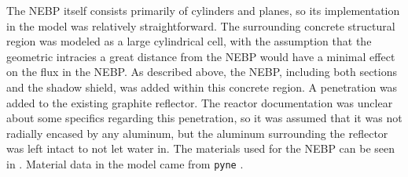 The NEBP itself consists primarily of cylinders and planes, so its implementation in the model was relatively straightforward.
The surrounding concrete structural region was modeled as a large cylindrical cell, with the assumption that the geometric intracies a great distance from the NEBP would have a minimal effect on the flux in the NEBP.
As described above, the NEBP, including both sections and the shadow shield, was added within this concrete region.
A penetration was added to the existing graphite reflector.
The reactor documentation was unclear about some specifics regarding this penetration, so it was assumed that it was not radially encased by any aluminum, but the aluminum surrounding the reflector was left intact to not let water in.
The materials used for the NEBP can be seen in .
Material data in the model came from {\tt pyne} \cite{scopatz2012pyne}.



